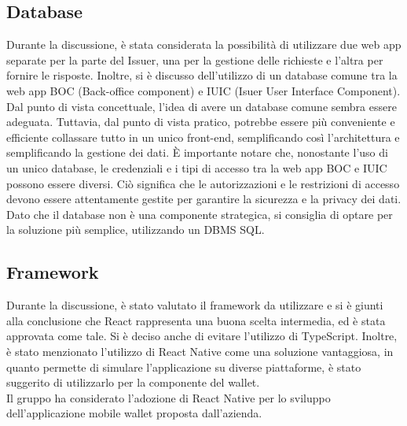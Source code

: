 \subsection{Database}
Durante la discussione, è stata considerata la possibilità di utilizzare due web app separate per la parte del Issuer, una per la gestione delle richieste e l'altra per fornire 
le risposte. Inoltre, si è discusso dell'utilizzo di un database comune tra la web app BOC (Back-office component) e IUIC 
(Isuer User Interface Component).\\
Dal punto di vista concettuale, l'idea di avere un database comune sembra essere adeguata. 
Tuttavia, dal punto di vista pratico, potrebbe essere più conveniente e efficiente collassare tutto in un unico front-end, semplificando così 
l'architettura e semplificando la gestione dei dati. È importante notare che, nonostante l'uso di un unico database, le credenziali e i tipi di accesso 
tra la web app BOC e IUIC possono essere diversi. Ciò significa che le autorizzazioni e le restrizioni di accesso devono essere attentamente gestite 
per garantire la sicurezza e la privacy dei dati. Dato che il database non è una componente strategica, si consiglia di optare per la soluzione più semplice, 
utilizzando un DBMS SQL.

\subsection{Framework}
Durante la discussione, è stato valutato il framework da utilizzare e si è giunti alla conclusione che React rappresenta una buona scelta intermedia, 
ed è stata approvata come tale. Si è deciso anche di evitare l'utilizzo di TypeScript. Inoltre, è stato menzionato l'utilizzo di React Native come 
una soluzione vantaggiosa, in quanto permette di simulare l'applicazione su diverse piattaforme, è stato suggerito di utilizzarlo per la componente del wallet.\\
Il gruppo ha considerato l'adozione di React Native per lo sviluppo dell'applicazione mobile wallet proposta dall'azienda.

